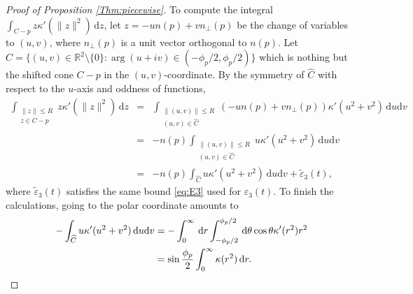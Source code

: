 \documentclass[10pt,a4paper]{amsart}
\newcommand{\R}{\mathbb{R}}  %
\newcommand{\ep}{\varepsilon}
\newcommand{\pp}{p}
\renewcommand{\d}{\mathrm{d}}  %
\begin{document}
\begin{proof}[Proof of Proposition \ref{Thm:piecewise}] 
To compute the integral $\int_{C-\pp} z \kappa'(\|z  \|^2) \,\d z$, let $z= - u n(\pp) + v n_{\perp}(\pp)$ be the change of variables to $(u,v)$, where $n_\perp(\pp)$ is a unit vector orthogonal to $n(\pp)$. Let $\widehat C=\{(u,v)\in \R^2\setminus\{0\}: \arg (u+i v) \in (-\phi_\pp/2,\phi_\pp/2)\}$ which is nothing but the shifted cone $C - \pp$ in the $(u,v)$-coordinate. By the symmetry of $\widehat C$ with respect to the $u$-axis and oddness of functions, 
\begin{eqnarray*}
\int_{\substack{\|z\|\leq R\\ z\in C -\pp}} z \kappa'(\|z\|^2) \,\d z
&=& \int_{\substack{\|(u,v)\|\leq R\\ (u,v)\in \widehat C}} (-u n(\pp) + v n_{\perp}(\pp)) \kappa'(u^2+v^2) \,\d u \d v \\
&=& -n(\pp) \int_{\substack{\|(u,v)\|\leq R\\ (u,v)\in \widehat C}} u \kappa'(u^2+v^2) \,\d u \d v \\
&=& -n(\pp) \int_{\widehat C} u \kappa'(u^2+v^2) \,\d u \d v +\widetilde \ep_3(t),  
\end{eqnarray*}
where $\widetilde \ep_3(t)$ satisfies the same bound \eqref{eq:E3} used for $\ep_3(t)$. 
To finish the calculations, going to the polar coordinate amounts to 
\begin{align}
-\int_{ \widehat C} u \kappa'(u^2+v^2) \,\d u \d v \notag
&= -\int_{0}^\infty \,\d r \int_{-\phi_\pp/2}^{\phi_\pp/2}\,\d\theta \cos \theta \kappa'(r^2) r^2 \notag \\ 
&= \sin \frac{\phi_\pp}{2} \int_0^\infty \kappa(r^2)\,\d r.     \tag*{\qedhere}
\end{align}
\end{proof}
\end{document}
